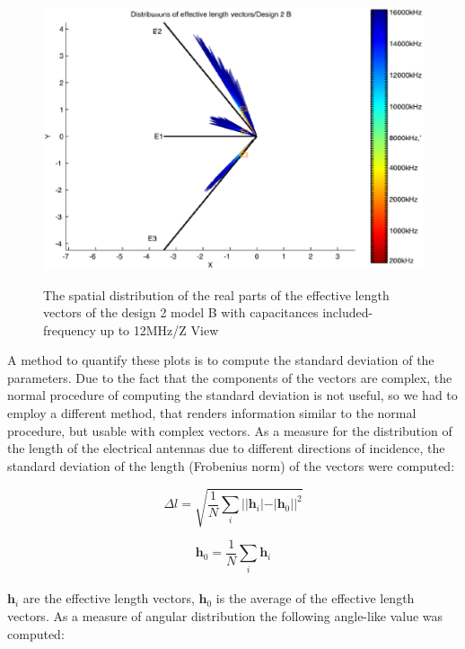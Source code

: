 \documentclass[a4paper,14pt]{extbook}
\begin{document}
\begin{figure}
\begin{center}
\includegraphics[scale=0.65]{HeffVerteilungD2-ZView_B_caps3.eps} \\
\caption{The spatial distribution of the real parts of the effective length vectors of the design 2 model B with capacitances included-frequency up to 12MHz/Z View }\label{fig_heff_dist_D2_B_Z_View_caps3}
\end{center}
\end{figure}


A method to quantify these plots is to compute the standard
deviation of the parameters. Due to the fact that the components
of the vectors are complex, the normal procedure of computing the
standard deviation is not useful, so we had to employ a different
method, that renders information similar to the normal procedure,
but usable with complex vectors. As a measure for the
distribution of the length of the electrical antennas due to
different directions of incidence, the standard deviation of the
length (Frobenius norm) of the vectors were computed:

\begin{equation}
\Delta l = \sqrt{\frac{1}{N} \sum_i \vert \vert{\textbf{h}}_i\vert
- \vert{\textbf{h}}_0 \vert \vert^2}
\end{equation}

\begin{equation}
\textbf{h}_0=\frac{1}{N}\sum_i \textbf{h}_i
\end{equation}
\paragraph*{}
$\textbf{h}_i$ are the effective length vectors, $\textbf{h}_0$ is the average of the effective length vectors. As a measure of angular distribution the following angle-like value was computed:\\
\end{document}

